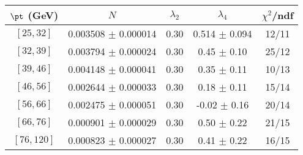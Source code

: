 \begin{tabular}{c||c|c|c|c}
$\pt$ (GeV) & $N$ & $\lambda_{2}$ & $\lambda_4$  & $\chi^2$/ndf  \\
\hline
$[25, 32]$ & 0.003508 $\pm$ 0.000014 & 0.30 & 0.514 $\pm$ 0.094 & 12/11\\
$[32, 39]$ & 0.003794 $\pm$ 0.000024 & 0.30 & 0.45 $\pm$ 0.10 & 25/12\\
$[39, 46]$ & 0.004148 $\pm$ 0.000041 & 0.30 & 0.35 $\pm$ 0.11 & 10/13\\
$[46, 56]$ & 0.002644 $\pm$ 0.000033 & 0.30 & 0.18 $\pm$ 0.11 & 15/14\\
$[56, 66]$ & 0.002475 $\pm$ 0.000051 & 0.30 & -0.02 $\pm$ 0.16 & 20/14\\
$[66, 76]$ & 0.000901 $\pm$ 0.000029 & 0.30 & 0.50 $\pm$ 0.22 & 21/15\\
$[76, 120]$ & 0.000823 $\pm$ 0.000027 & 0.30 & 0.41 $\pm$ 0.22 & 16/15\\
\end{tabular}
